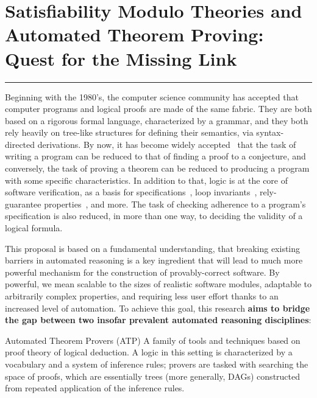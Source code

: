 
\section*{Satisfiability Modulo Theories and Automated Theorem Proving:\\ Quest for the Missing Link}

\vspace{-.5em}
\hrule

\vspace{1.2em}
Beginning with the 1980's, the computer science community has accepted
that computer programs and logical proofs are made of the same fabric.
They are both based on a rigorous formal language, characterized by a grammar,
and they both rely heavily on tree-like structures for defining their semantics,
via syntax-directed derivations.
By now, it has become widely accepted~\cite{curry-howard} that the task of writing a program can be
reduced to that of finding a proof to a conjecture, and conversely, the task of
proving a theorem can be reduced to producing a program with some specific
characteristics.
In addition to that, logic is at the core of software verification, as a basis
for specifications~\cite{dafny,boogie,seahorn}, loop invariants~\cite{ic3,spacer,..}, rely-guarantee properties~\cite{relyguarantee1,..}, and more.
The task of checking adherence to a program's specification is also reduced, in
more than one way, to deciding the validity of a logical formula.

\medskip
This proposal is based on a fundamental understanding, that breaking existing
barriers in automated reasoning is a key ingredient that will lead to
much more powerful mechanism for the construction of provably-correct software.
By powerful, we mean scalable to the sizes of realistic software modules,
adaptable to arbitrarily complex properties,
and requiring less user effort thanks to an increased level of automation.
To achieve this goal, this research \textbf{aims to bridge the gap between two insofar prevalent automated  reasoning disciplines}:

\begin{paragraph}{Automated Theorem Provers (ATP)} A family of tools and techniques based on proof
theory of logical deduction.
A logic in this setting is characterized by a vocabulary and a system of
inference rules; provers are tasked with searching the space of proofs, which
are essentially trees (more generally, DAGs) constructed from repeated
application of the inference rules.
\end{paragraph}

